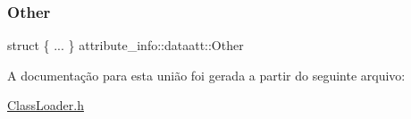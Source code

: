 \subsubsection{\texorpdfstring{Other}{Other}}
{\footnotesize\ttfamily struct \{ ... \}   attribute\+\_\+info\+::dataatt\+::\+Other}



A documentação para esta união foi gerada a partir do seguinte arquivo\+:\begin{DoxyCompactItemize}
\item 
\hyperlink{ClassLoader_8h}{Class\+Loader.\+h}\end{DoxyCompactItemize}
